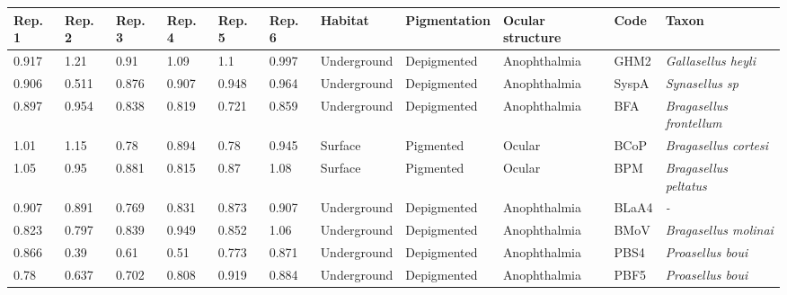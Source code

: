 \begin{tabular}{lllllllllll}
\toprule
         Rep. 1 &          Rep. 2 &          Rep. 3 &          Rep. 4 &          Rep. 5 &          Rep. 6 &      Habitat & Pigmentation & Ocular structure &     Code &                                    Taxon \\
\midrule
          0.917 &            1.21 &            0.91 &            1.09 &             1.1 &           0.997 &  Underground &  Depigmented &     Anophthalmia &     GHM2 &               \textit{Gallasellus heyli} \\
          0.906 &           0.511 &           0.876 &           0.907 &           0.948 &           0.964 &  Underground &  Depigmented &     Anophthalmia &    SyspA &                   \textit{Synasellus sp} \\
          0.897 &           0.954 &           0.838 &           0.819 &           0.721 &           0.859 &  Underground &  Depigmented &     Anophthalmia &      BFA &          \textit{Bragasellus frontellum} \\
           1.01 &            1.15 &            0.78 &           0.894 &            0.78 &           0.945 &      Surface &    Pigmented &           Ocular &     BCoP &             \textit{Bragasellus cortesi} \\
           1.05 &            0.95 &           0.881 &           0.815 &            0.87 &            1.08 &      Surface &    Pigmented &           Ocular &      BPM &            \textit{Bragasellus peltatus} \\
          0.907 &           0.891 &           0.769 &           0.831 &           0.873 &           0.907 &  Underground &  Depigmented &     Anophthalmia &    BLaA4 &                               \textit{-} \\
          0.823 &           0.797 &           0.839 &           0.949 &           0.852 &            1.06 &  Underground &  Depigmented &     Anophthalmia &     BMoV &             \textit{Bragasellus molinai} \\
          0.866 &            0.39 &            0.61 &            0.51 &           0.773 &           0.871 &  Underground &  Depigmented &     Anophthalmia &     PBS4 &                 \textit{Proasellus boui} \\
           0.78 &           0.637 &           0.702 &           0.808 &           0.919 &           0.884 &  Underground &  Depigmented &     Anophthalmia &     PBF5 &                 \textit{Proasellus boui} \\

\end{tabular}

